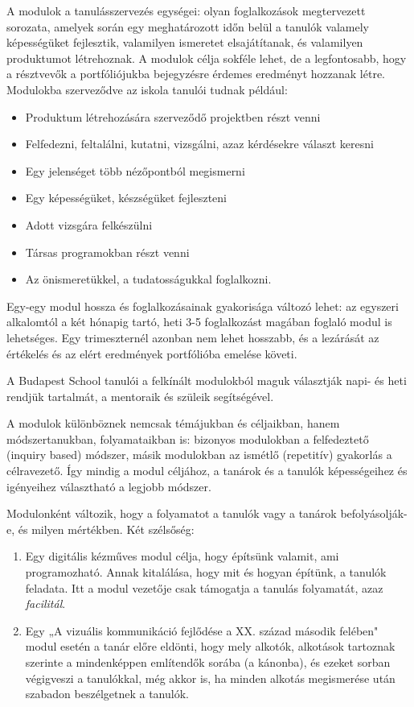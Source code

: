 A modulok a tanulásszervezés egységei: olyan foglalkozások megtervezett sorozata, amelyek során egy meghatározott időn belül a tanulók valamely képességüket fejlesztik, valamilyen ismeretet elsajátítanak, és valamilyen produktumot létrehoznak. A modulok célja sokféle lehet, de a legfontosabb, hogy a résztvevők a portfóliójukba bejegyzésre érdemes eredményt hozzanak létre. Modulokba szerveződve az iskola tanulói tudnak például:
\begin{itemize}
\item Produktum létrehozására szerveződő projektben részt venni

\item Felfedezni, feltalálni, kutatni, vizsgálni, azaz kérdésekre választ keresni

\item Egy jelenséget több nézőpontból megismerni

\item Egy képességüket, készségüket fejleszteni

\item Adott vizsgára felkészülni

\item Társas programokban részt venni

\item Az önismeretükkel, a tudatosságukkal foglalkozni.
\end{itemize}

Egy-egy modul hossza és foglalkozásainak gyakorisága változó lehet: az egyszeri alkalomtól a két hónapig tartó, heti 3-5 foglalkozást magában foglaló modul is lehetséges. Egy trimeszternél azonban nem lehet hosszabb, és a lezárását az értékelés és az elért eredmények portfólióba emelése követi.

A Budapest School tanulói a felkínált modulokból maguk választják napi- és heti rendjük tartalmát, a mentoraik és szüleik segítségével.

A modulok különböznek nemcsak témájukban és céljaikban, hanem módszertanukban, folyamataikban is: bizonyos modulokban a felfedeztető (inquiry based) módszer, másik modulokban az ismétlő (repetitív) gyakorlás a célravezető. Így mindig a modul céljához, a tanárok és a tanulók képességeihez és igényeihez választható a legjobb módszer.

Modulonként változik, hogy a folyamatot a tanulók vagy a tanárok befolyásolják-e, és milyen mértékben. Két szélsőség:
\begin{enumerate}
\item Egy digitális kézműves modul célja, hogy építsünk valamit, ami programozható. Annak kitalálása, hogy mit és hogyan építünk, a tanulók feladata. Itt a modul vezetője csak támogatja a tanulás folyamatát, azaz \emph{facilitál}.

\item Egy „A vizuális kommunikáció fejlődése a XX. század második felében" modul esetén a tanár előre eldönti, hogy mely alkotók, alkotások tartoznak szerinte a mindenképpen említendők sorába (a kánonba), és ezeket sorban végigveszi a tanulókkal, még akkor is, ha minden alkotás megismerése után szabadon beszélgetnek a tanulók.
\end{enumerate}

